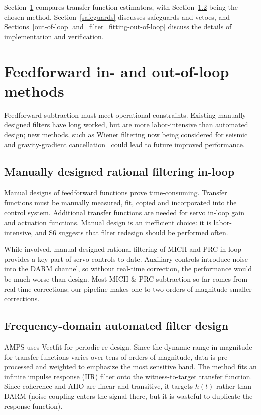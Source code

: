 Section~\ref{prior_programs} compares transfer function estimators, with Section~\ref{vectfit} being the chosen method. Section~\ref{safeguards} discusses safeguards and vetoes, and Sections~\ref{out-of-loop} and~\ref{filter_fitting-out-of-loop} discuss the details of implementation and verification.

    \section{Feedforward in- and out-of-loop methods}
    \label{prior_programs}
   
        Feedforward subtraction must meet operational constraints. Existing manually designed filters have long worked, but are more labor-intensive than automated design; new methods, such as Wiener filtering now being considered for seismic and gravity-gradient cancellation~\cite{Driggers2012ActiveNoise} could lead to future improved performance.
        
        \subsection{Manually designed rational filtering in-loop}
        \label{manual_design}

            Manual designs of feedforward functions prove time-consuming. Transfer functions must be manually measured, fit, copied and incorporated into the control system. Additional transfer functions are needed for servo in-loop gain and actuation functions. Manual design is an inefficient choice: it is labor-intensive, and S6 suggests that filter redesign should be performed often.

	While involved, manual-designed rational filtering of MICH and PRC in-loop provides a key part of servo controls to date. Auxiliary controls introduce noise into the DARM channel, so  without real-time correction, the performance would be much worse than design. Most MICH \& PRC subtraction so far comes from real-time corrections; our pipeline makes one to two orders of magnitude smaller corrections.

        \subsection{Frequency-domain automated filter design}
        \label{vectfit}

            AMPS uses Vectfit for periodic re-design. Since the dynamic range in magnitude for transfer functions varies over tens of orders of magnitude, data is pre-processed and weighted to emphasize the most sensitive band.
The method fits an infinite impulse response (IIR) filter onto the witness-to-target transfer function. Since coherence and AHO are linear and transitive, it targets $h(t)$ rather than DARM (noise coupling enters the signal there, but it is wasteful to duplicate the response function).

